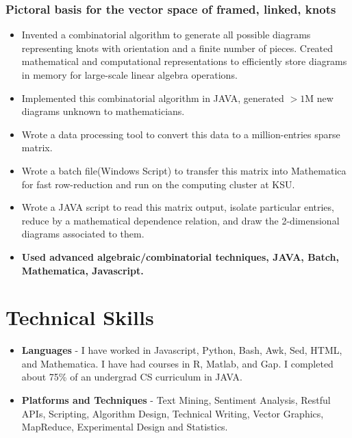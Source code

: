 \documentclass[a4paper,10pt,notitlepage]{article}
\begin{document}
\subsubsection*{Pictoral basis for the vector space of framed, linked, knots}
	\begin{itemize}
	\vspace{-5pt}\item 	Invented a combinatorial algorithm to generate all possible diagrams representing knots with orientation and a finite number of pieces. Created mathematical and computational representations to efficiently store diagrams in memory for large-scale linear algebra operations.
	\vspace{-5pt}\item 	Implemented this combinatorial algorithm in JAVA, generated $>1$M new diagrams unknown to mathematicians. 
	\vspace{-5pt}\item 	Wrote a data processing tool to convert this data to a million-entries sparse matrix.
	\vspace{-5pt}\item 	Wrote a batch file(Windows Script) to transfer this matrix into Mathematica for fast row-reduction and run on the computing cluster at KSU.
	\vspace{-5pt}\item  	Wrote a JAVA script to read this matrix output, isolate particular entries, reduce by a mathematical dependence relation, and draw the 2-dimensional diagrams associated to them.
	 \vspace{-5pt}\item 	\textbf{Used advanced algebraic/combinatorial techniques, JAVA, Batch, Mathematica, Javascript.}
	\end{itemize}
	
\vspace{-10pt}\section*{Technical Skills}

	\begin{itemize}
		\item \textbf{Languages} - I have worked in Javascript, Python, Bash, Awk, Sed, HTML, and Mathematica. I have had courses in R, Matlab, and Gap. I completed about 75\% of an undergrad CS curriculum in JAVA. 
		\item \textbf{Platforms and Techniques} -  Text Mining, Sentiment Analysis, Restful APIs, Scripting, Algorithm Design, Technical Writing, Vector Graphics, MapReduce, Experimental Design and Statistics.
	\end{itemize}
\end{document}
